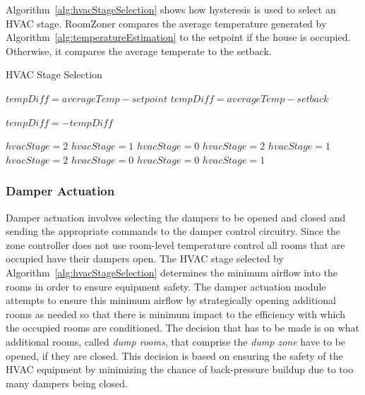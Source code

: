 Algorithm~\ref{alg:hvacStageSelection} shows how hysteresis is used to select an
HVAC stage. RoomZoner compares the average temperature generated by
Algorithm~\ref{alg:temperatureEstimation} to the setpoint if the house is
occupied. Otherwise, it compares the average temperate to the setback.

\begin{algorithm}[!htb]                      %
\caption{HVAC Stage Selection}          %
\label{alg:hvacStageSelection}%
\begin{algorithmic}                    %
\STATE $tempDiff = averageTemp - setpoint$
\ELSE
\STATE $tempDiff = averageTemp - setback$
\ENDIF

\STATE $tempDiff = -tempDiff$
\ENDIF

\STATE $hvacStage = 2$
\STATE $hvacStage = 1$
\ELSE
\STATE $hvacStage = 0$
\ENDIF
{}
\STATE $hvacStage = 2$
\STATE $hvacStage = 1$
\ENDIF
{}
\STATE $hvacStage = 2$
\STATE $hvacStage = 0$
\ENDIF
\ELSE
{}
\STATE $hvacStage = 0$
\STATE $hvacStage = 1$
\ENDIF
\ENDIF
\end{algorithmic}
\end{algorithm}

\subsubsection{Damper Actuation}
\label{sec:damperActuation}


Damper actuation involves selecting the dampers to be opened and closed and
sending the appropriate commands to the damper control circuitry. Since the zone
controller does not use room-level temperature control all rooms that are
occupied have their dampers open. The HVAC stage selected by
Algorithm~\ref{alg:hvacStageSelection} determines the minimum airflow into the
rooms in order to ensure equipment safety. The damper actuation module attempts
to ensure this minimum airflow by strategically opening additional rooms as
needed so that there is minimum impact to the efficiency with which the occupied
rooms are conditioned. The decision that has to be made is on what additional
rooms, called {\em dump rooms}, that comprise the {\em dump zone} have to be
opened, if they are closed. This decision is based on ensuring the safety of the
HVAC equipment by minimizing the chance of back-pressure buildup due to too many
dampers being closed.

